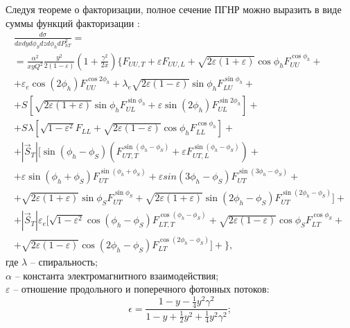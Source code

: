 \documentclass{extreport}
\begin{document}
Следуя теореме о факторизации, полное сечение ПГНР можно выразить в виде суммы функций факторизации \cite{Anselmino_2011}:
\begin{multline} 
	\label{sigma}
	\frac{d\sigma}{dx dy d \phi_S dz d \phi_{h} dP^{2}_{h T}} = \\
	= \frac{\alpha^2}{xy Q^{2}} \frac{y^2}{2 (1 - \varepsilon)} \left(1 + \frac{\gamma^2}{2x} \right)
	\Biggl \lbrace F_{U U, T} +
	\varepsilon F_{U U, L} +
	\sqrt{2 \varepsilon (1 + \varepsilon)} \cos \phi_h F_{UU}^{\cos \phi_h} + \\
	+ \varepsilon_e \cos(2\phi_h) F_{U U}^{\cos 2\phi_h} +
	\lambda_e \sqrt{2 \varepsilon (1 - \varepsilon)} \sin \phi_h F_{L U}^{\sin \phi_h} + \\
	+ S_{} \left [ \sqrt{2 \varepsilon (1 + \varepsilon)} \sin \phi_h F_{UL}^{\sin \phi_h} +
	\varepsilon \sin(2\phi_h) F_{UL}^{\sin 2\phi_h} \right] + \\
	+ S_{} \lambda \left [ \sqrt{1 - \varepsilon^2} F_{L L} +
	\sqrt{2 \varepsilon (1 - \varepsilon)} \cos \phi_h F_{LL}^{\cos \phi_h} \right] + \\
	+ |\vec S_{T}| \Biggl[ \sin(\phi_h - \phi_S) \left(F_{U T, T}^{\sin(\phi_h - \phi_S)} +
	\varepsilon F_{UT, L}^{\sin(\phi_h - \phi_S)} \right) + \\
	+ \varepsilon \sin(\phi_h + \phi_S) F_{U T}^{\sin (\phi_h + \phi_S)} +
	\varepsilon sin (3\phi_h - \phi_S) F_{UT}^{\sin (3\phi_h - \phi_S)} + \\
	+ \sqrt{2 \varepsilon (1 + \varepsilon)} \sin \phi_S F_{UT}^{\sin \phi_S} +
	\sqrt{2 \varepsilon (1 + \varepsilon)} \sin(2\phi_h - \phi_S) F_{UT}^{\sin(2\phi_h - \phi_S)}  \Biggr] + \\
	+ |\vec S_{T}| \varepsilon_e \Biggl[ \sqrt{1 - \varepsilon^2} \cos(\phi_h - \phi_S) F_{LT, T}^{\cos(\phi_h - \phi_S)} +
	\sqrt{2 \varepsilon (1 - \varepsilon)} \cos \phi_S F_{LT}^{\cos \phi_S} + \\
	+ \sqrt{2 \varepsilon (1 - \varepsilon)} \cos(2\phi_h - \phi_S) F_{LT}^{\cos(2\phi_h - \phi_S)}  \Biggr] + \Biggr \rbrace,
\end{multline}
где $\lambda$ -- спиральность; \\
$\alpha$ -- константа электромагнитного взаимодействия; \\
 $\varepsilon$ -- отношение продольного и поперечного фотонных потоков:
\begin{equation}
	\epsilon = \frac{1-y-\frac{1}{4}y^2\gamma^2}{1-y+\frac{1}{2} y^2 +\frac{1}{4}y^2\gamma^2};
\end{equation}
\end{document}

